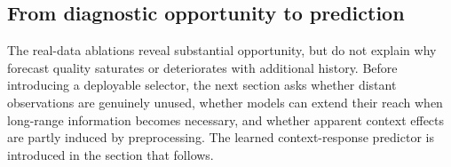 \subsection{From diagnostic opportunity to prediction}
\label{sec:real-bridge}

The real-data ablations reveal substantial opportunity, but do not explain why
forecast quality saturates or deteriorates with additional history.  Before
introducing a deployable selector, the next section asks whether distant
observations are genuinely unused, whether models can extend their reach when
long-range information becomes necessary, and whether apparent context effects
are partly induced by preprocessing.  The learned context-response predictor
is introduced in the section that follows.
